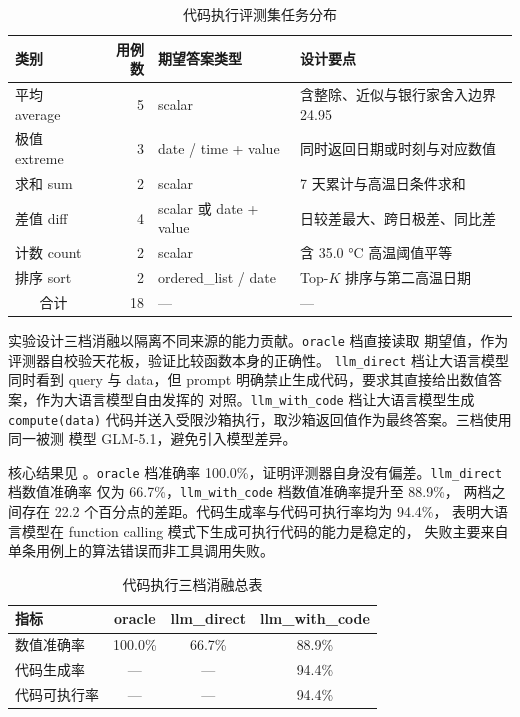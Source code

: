 \begin{table}[!ht]
    \centering
    \caption{代码执行评测集任务分布}
    \label{tab:code-bench-design}
    \song\wuhao
    \begin{tabular}{lrll}
        \toprule
        类别 & 用例数 & 期望答案类型 & 设计要点 \\
        \midrule
        平均 average & 5 & scalar & 含整除、近似与银行家舍入边界 24.95 \\
        极值 extreme & 3 & date / time + value & 同时返回日期或时刻与对应数值 \\
        求和 sum & 2 & scalar & 7 天累计与高温日条件求和 \\
        差值 diff & 4 & scalar 或 date + value & 日较差最大、跨日极差、同比差 \\
        计数 count & 2 & scalar & 含 35.0 °C 高温阈值平等 \\
        排序 sort & 2 & ordered\_list / date & Top-$K$ 排序与第二高温日期 \\
        \midrule
        \multicolumn{1}{c}{合计} & 18 & --- & --- \\
        \bottomrule
    \end{tabular}
\end{table}

实验设计三档消融以隔离不同来源的能力贡献。\texttt{oracle} 档直接读取
期望值，作为评测器自校验天花板，验证比较函数本身的正确性。
\texttt{llm\_\bk{}direct} 档让大语言模型同时看到 query 与 data，但 prompt
明确禁止生成代码，要求其直接给出数值答案，作为大语言模型自由发挥的
对照。\texttt{llm\_\bk{}with\_\bk{}code} 档让大语言模型生成 \texttt{compute(data)}
代码并送入受限沙箱执行，取沙箱返回值作为最终答案。三档使用同一被测
模型 GLM-5.1，避免引入模型差异。

核心结果见 。\texttt{oracle} 档准确率
100.0\%，证明评测器自身没有偏差。\texttt{llm\_\bk{}direct} 档数值准确率
仅为 66.7\%，\texttt{llm\_\bk{}with\_\bk{}code} 档数值准确率提升至 88.9\%，
两档之间存在 22.2 个百分点的差距。代码生成率与代码可执行率均为 94.4\%，
表明大语言模型在 function calling 模式下生成可执行代码的能力是稳定的，
失败主要来自单条用例上的算法错误而非工具调用失败。

\begin{table}[!ht]
    \centering
    \caption{代码执行三档消融总表}
    \label{tab:code-eval-overall}
    \song\wuhao
    \begin{tabular}{lccc}
        \toprule
        指标 & oracle & llm\_direct & llm\_with\_code \\
        \midrule
        数值准确率 & 100.0\% & 66.7\% & 88.9\% \\
        代码生成率 & --- & --- & 94.4\% \\
        代码可执行率 & --- & --- & 94.4\% \\
        \bottomrule
    \end{tabular}
\end{table}

